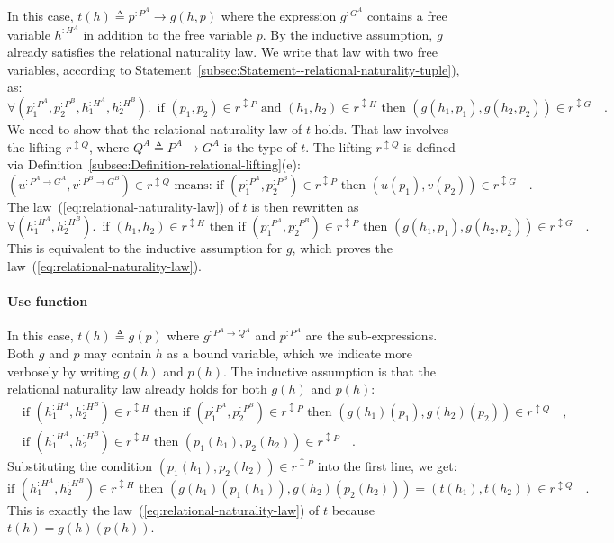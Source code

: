 In this case, $t(h)\triangleq p^{:P^{A}}\rightarrow g(h,p)$ where
the expression $g^{:G^{A}}$ contains a free variable $h^{:H^{A}}$
in addition to the free variable $p$. By the inductive assumption,
$g$ already satisfies the relational naturality law. We write that
law with two free variables, according to Statement~\ref{subsec:Statement--relational-naturality-tuple}),
as:
\[
\forall(p_{1}^{:P^{A}},p_{2}^{:P^{B}},h_{1}^{:H^{A}},h_{2}^{:H^{B}}).\,\text{ if }(p_{1},p_{2})\in r^{\updownarrow P}\text{ and }(h_{1},h_{2})\in r^{\updownarrow H}\text{ then }(g(h_{1},p_{1}),g(h_{2},p_{2}))\in r^{\updownarrow G}\quad.
\]
We need to show that the relational naturality law of $t$ holds.
That law involves the lifting $r^{\updownarrow Q}$, where $Q^{A}\triangleq P^{A}\rightarrow G^{A}$
is the type of $t$. The lifting $r^{\updownarrow Q}$ is defined
via Definition~\ref{subsec:Definition-relational-lifting}(e):
\[
(u^{:P^{A}\rightarrow G^{A}},v^{:P^{B}\rightarrow G^{B}})\in r^{\updownarrow Q}\text{ means: if }(p_{1}^{:P^{A}},p_{2}^{:P^{B}})\in r^{\updownarrow P}\text{ then }(u(p_{1}),v(p_{2}))\in r^{\updownarrow G}\quad.
\]
The law~(\ref{eq:relational-naturality-law}) of $t$ is then rewritten
as
\[
\forall(h_{1}^{:H^{A}},h_{2}^{:H^{B}}).\,\text{ if }(h_{1},h_{2})\in r^{\updownarrow H}\text{ then if }(p_{1}^{:P^{A}},p_{2}^{:P^{B}})\in r^{\updownarrow P}\text{ then }(g(h_{1},p_{1}),g(h_{2},p_{2}))\in r^{\updownarrow G}\quad.
\]
This is equivalent to the inductive assumption for $g$, which proves
the law~(\ref{eq:relational-naturality-law}).

\paragraph{Use function}

In this case, $t(h)\triangleq g(p)$ where $g^{:P^{A}\rightarrow Q^{A}}$
and $p^{:P^{A}}$ are the sub-expressions. Both $g$ and $p$ may
contain $h$ as a bound variable, which we indicate more verbosely
by writing $g(h)$ and $p(h)$. The inductive assumption is that the
relational naturality law already holds for both $g(h)$ and $p(h)$:
\begin{align*}
 & \text{if }(h_{1}^{:H^{A}},h_{2}^{:H^{B}})\in r^{\updownarrow H}\text{ then if }(p_{1}^{:P^{A}},p_{2}^{:P^{B}})\in r^{\updownarrow P}\text{ then }(g(h_{1})(p_{1}),g(h_{2})(p_{2}))\in r^{\updownarrow Q}\quad,\\
 & \text{if }(h_{1}^{:H^{A}},h_{2}^{:H^{B}})\in r^{\updownarrow H}\text{ then }(p_{1}(h_{1}),p_{2}(h_{2}))\in r^{\updownarrow P}\quad.
\end{align*}
Substituting the condition $(p_{1}(h_{1}),p_{2}(h_{2}))\in r^{\updownarrow P}$
into the first line, we get:
\[
\text{if }(h_{1}^{:H^{A}},h_{2}^{:H^{B}})\in r^{\updownarrow H}\text{ then }(g(h_{1})(p_{1}(h_{1})),g(h_{2})(p_{2}(h_{2})))=(t(h_{1}),t(h_{2}))\in r^{\updownarrow Q}\quad.
\]
This is exactly the law~(\ref{eq:relational-naturality-law}) of
$t$ because $t(h)=g(h)(p(h))$.


